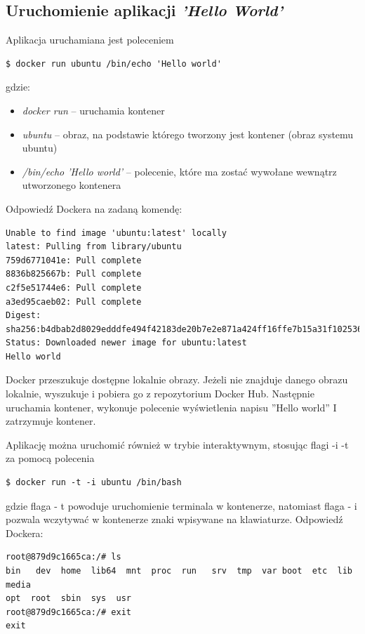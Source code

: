 \subsection{Uruchomienie aplikacji \textit{'Hello World'}}
Aplikacja uruchamiana jest poleceniem
\begin{lstlisting}[style=incode]
$ docker run ubuntu /bin/echo 'Hello world'
\end{lstlisting}
gdzie:
\begin{itemize}
\item \textit{docker run} – uruchamia kontener
\item \textit{ubuntu} – obraz, na podstawie którego tworzony jest kontener (obraz systemu ubuntu)
\item \textit{/bin/echo  'Hello world'} – polecenie, które ma zostać wywołane wewnątrz 	utworzonego kontenera \newline
\end{itemize}
Odpowiedź Dockera na zadaną komendę:
\begin{lstlisting}[style=incode]
Unable to find image 'ubuntu:latest' locally
latest: Pulling from library/ubuntu
759d6771041e: Pull complete
8836b825667b: Pull complete
c2f5e51744e6: Pull complete
a3ed95caeb02: Pull complete
Digest: sha256:b4dbab2d8029edddfe494f42183de20b7e2e871a424ff16ffe7b15a31f102536
Status: Downloaded newer image for ubuntu:latest
Hello world
\end{lstlisting}

Docker przeszukuje dostępne lokalnie obrazy. Jeżeli nie znajduje  danego obrazu lokalnie, wyszukuje i pobiera go z  repozytorium Docker Hub. Następnie uruchamia kontener, wykonuje polecenie wyświetlenia napisu ''Hello world'' I zatrzymuje kontener.


Aplikację można uruchomić również w trybie interaktywnym, stosując flagi -i -t za pomocą polecenia
\begin{lstlisting}[style=incode]
$ docker run -t -i ubuntu /bin/bash
\end{lstlisting}
gdzie flaga - t powoduje uruchomienie terminala w kontenerze, natomiast flaga - i pozwala wczytywać w kontenerze znaki wpisywane na klawiaturze.
Odpowiedź Dockera:
\begin{lstlisting}[style=incode]
root@879d9c1665ca:/# ls
bin   dev  home  lib64  mnt  proc  run   srv  tmp  var boot  etc  lib   media  
opt  root  sbin  sys  usr
root@879d9c1665ca:/# exit
exit
\end{lstlisting}

